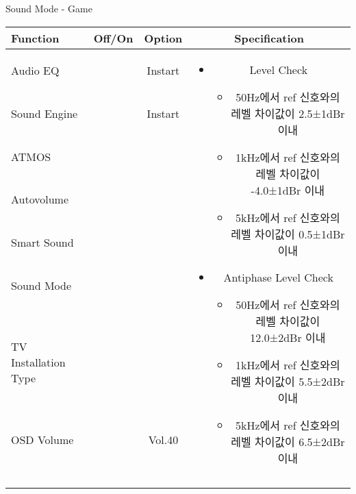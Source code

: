 \begin{frame}[t]{Sound Mode - Game}
\begin{tiny}
\begin{tabular}{@{}lccc@{}}
\toprule
Function & Off/On & Option & Specification \\
\midrule
Audio EQ & \color{black}{Off} & Instart &
\multirow{10}{60mm}{
\begin{itemize}
    \item Level Check
    \begin{itemize}
        \item 50Hz에서 ref 신호와의 레벨 차이값이 2.5±1dBr 이내
        \item 1kHz에서 ref 신호와의 레벨 차이값이 -4.0±1dBr 이내
        \item 5kHz에서 ref 신호와의 레벨 차이값이 0.5±1dBr 이내
    \end{itemize}
    \item Antiphase Level Check
    \begin{itemize}
        \item 50Hz에서 ref 신호와의 레벨 차이값이 12.0±2dBr 이내
        \item 1kHz에서 ref 신호와의 레벨 차이값이 5.5±2dBr 이내
        \item 5kHz에서 ref 신호와의 레벨 차이값이 6.5±2dBr 이내
    \end{itemize}
\end{itemize}
} \\
Sound Engine & \color{blue}{On} & Instart & \\
ATMOS & \color{black}{Off}  & & \\
Autovolume & \color{black}{Off} & & \\
Smart Sound & \color{black}{Off} & & \\
Sound Mode & \color{blue}{On} & \color{blue}{Game} & \\
TV Installation Type & \color{blue}{On} & \color{black}{Standtype1} & \\
OSD Volume & \color{blue}{On} & Vol.40 & \\
& & & \\
& & & \\
& & & \\
& & & \\
\midrule
\end{tabular}
\end{tiny}

\end{frame}

